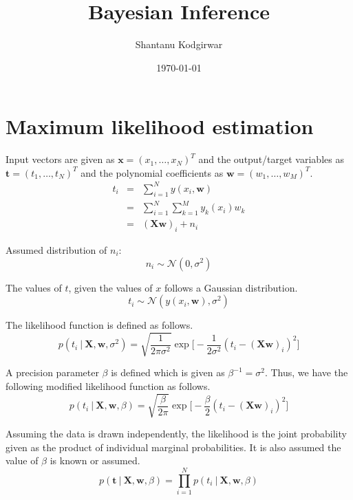 \documentclass[11pt]{article}
\title{Bayesian Inference}
\date{\today}
\author{Shantanu Kodgirwar}
\newcommand\given[1][]{\:#1\vert\:}
\begin{document}
\maketitle

\section{Maximum likelihood estimation}

Input vectors are given as $\bm{x} = (x_1, \ldots, x_N)^T$ and the output/target variables as $\bm{t} = (t_1, \ldots, t_N)^T$ and the polynomial coefficients as $\bm{w} = (w_1, \ldots, w_M)^T$.
\begin{eqnarray}
        t_{i}
        &=& \sum_{i=1}^N y(x_i, \bm{w})\\
        &=&
        \sum_{i=1}^N \sum_{k=1}^M y_k(x_i)w_k\\
        &=&
        (\bm{X}\bm{w})_i + n_i
\end{eqnarray}

Assumed distribution of $n_i$:
\begin{equation}\label{eqn:model}
n_i \sim \mathcal{N}(0, \sigma^2)
\end{equation}

The values of $t$, given the values of $x$ follows a Gaussian distribution.
\begin{equation}
    t_i \sim \mathcal{N}(y(x_i, \bm{w}), \sigma^2)
\end{equation}

The likelihood function is defined as follows.
\begin{equation}
    p(t_i \given \bm{X}, \bm{w}, \sigma^2) = \sqrt{\frac{1}{2\pi\sigma^2}}\exp{\Big[-\frac{1}{2\sigma^2} \left(t_i - (\bm{X}\bm{w})_i\right)^2\Big]}
\end{equation}

A precision parameter $\beta$ is defined which is given as $\beta^{-1} = \sigma^2$. 
Thus, we have the following modified likelihood function as follows.
\begin{equation}
    p(t_i \given \bm{X}, \bm{w}, \beta) = \sqrt{\frac{\beta}{2\pi}}\exp{\Big[-\frac{\beta}{2} \left(t_i - (\bm{X}\bm{w})_i\right)^2\Big]}
\end{equation}

Assuming the data is drawn independently, the likelihood is the joint probability given as the product of individual marginal probabilities. It is also assumed the value of $\beta$ is known or assumed. 
\begin{equation}\label{eqn:likelihood}
    p(\bm{t} \given \bm{X}, \bm{w}, \beta) = \prod_{i=1}^N p(t_i \given \bm{X}, \bm{w}, \beta)
\end{equation}
\end{document}
